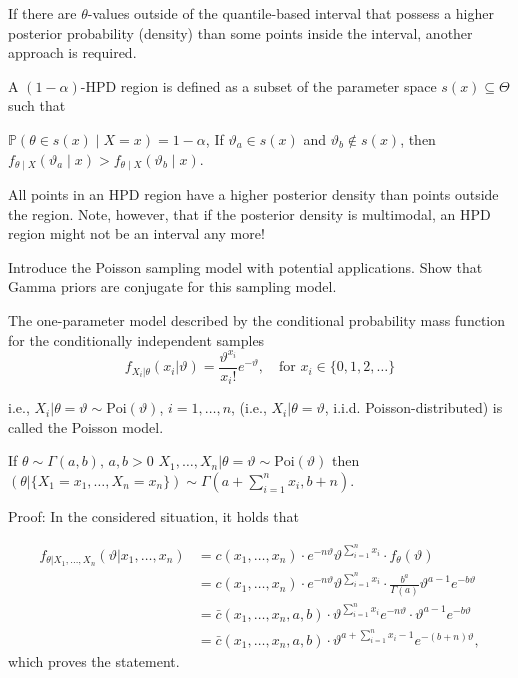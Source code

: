 If there are \( \theta \)-values outside of the quantile-based interval that possess a higher posterior probability
(density) than some points inside the interval, another approach is required.

A \( (1 - \alpha) \)-HPD region is defined as a subset of the parameter space \( s(x) \subseteq \Theta \) such that

\( \mathbb{P}(\theta \in s(x) \mid X = x) = 1 - \alpha \),
If \( \vartheta_a \in s(x) \) and \( \vartheta_b \notin s(x) \), then 
\( f_{\theta \mid X}(\vartheta_a \mid x) > f_{\theta \mid X}(\vartheta_b \mid x) \).

All points in an HPD region have a higher posterior density than points outside the region.
Note, however, that if the posterior density is multimodal, an HPD region might not be an interval any more!


Introduce the Poisson sampling model with potential applications. Show that
Gamma priors are conjugate for this sampling model.

The one-parameter model described by the conditional probability mass function for the conditionally independent samples
\[
f_{X_i|\theta}(x_i|\vartheta) = \frac{\vartheta^{x_i}}{x_i!} e^{-\vartheta}, \quad \text{for } x_i \in \{0, 1, 2, \ldots\}
\]

i.e., \(X_i|\theta = \vartheta \sim \text{Poi}(\vartheta)\), \(i = 1, \ldots, n\), (i.e., \(X_i|\theta = \vartheta\), 
i.i.d. Poisson-distributed) is called the Poisson model.

If \(\theta \sim \Gamma(a, b), \, a, b > 0\)
\(X_1, \ldots, X_n | \theta = \vartheta \sim \text{Poi}(\vartheta)\)
then \(\left( \theta \big| \{X_1 = x_1, \ldots, X_n = x_n\} \right) \sim \Gamma\left(a + \sum_{i=1}^n x_i, b + n\right)\).

Proof: In the considered situation, it holds that

\begin{align*}
f_{\theta|X_1,\ldots,X_n}(\vartheta|x_1,\ldots,x_n) &= c(x_1,\ldots,x_n) \cdot e^{-n\vartheta} \vartheta^{\sum_{i=1}^n x_i} \cdot f_{\theta}(\vartheta) \\
&= c(x_1,\ldots,x_n) \cdot e^{-n\vartheta} \vartheta^{\sum_{i=1}^n x_i} \cdot \frac{b^a}{\Gamma(a)} \vartheta^{a-1} e^{-b\vartheta} \\
&= \bar{c}(x_1,\ldots,x_n,a,b) \cdot \vartheta^{\sum_{i=1}^n x_i} e^{-n\vartheta} \cdot \vartheta^{a-1} e^{-b\vartheta} \\
&= \bar{c}(x_1,\ldots,x_n,a,b) \cdot \vartheta^{a + \sum_{i=1}^n x_i-1} e^{-(b+n)\vartheta},
\end{align*}
which proves the statement.

